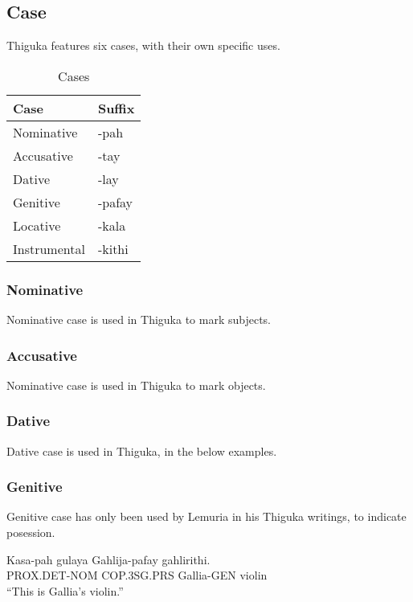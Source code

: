 \newpage{}

\subsection{Case}
Thiguka features six cases, with their own specific uses.

\begin{table}[h!]
    \centering
    \caption{Cases}
    \begin{tabularx}{8cm}{|X|X|}
        \hline
        \textbf{Case} & \textbf{Suffix} \\
        \hline
        Nominative & -pah \\
        Accusative & -tay \\
        Dative & -lay \\
        Genitive & -pafay \\
        Locative & -kala \\
        Instrumental & -kithi \\ 
        \hline
    \end{tabularx}
\end{table}

\subsubsection{Nominative}
Nominative case is used in Thiguka to mark subjects.

\subsubsection{Accusative}
Nominative case is used in Thiguka to mark objects.

\subsubsection{Dative}
Dative case is used in Thiguka, in the below examples.

\subsubsection{Genitive}
Genitive case has only been used by Lemuria in his Thiguka writings, to indicate posession.

\begin{exe}
\ex{} \gll{}Kasa-pah     gulaya     Gahlija-pafay gahlirithi.\\
            PROX.DET-NOM COP.3SG.PRS Gallia-GEN   violin\\
    \glt{}``This is Gallia's violin.''
\end{exe}

